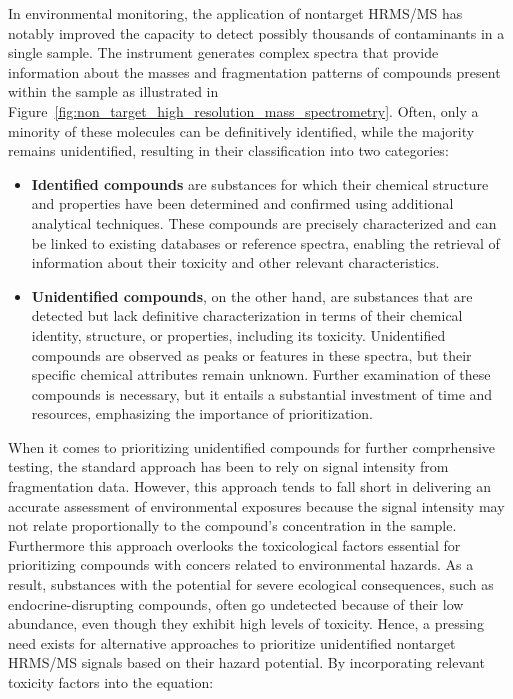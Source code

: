 In environmental monitoring, the application of nontarget HRMS/MS has notably improved the capacity to detect possibly thousands of contaminants in a single sample. The instrument generates complex spectra that provide information about the masses and fragmentation patterns of compounds present within the sample as illustrated in Figure~\ref{fig:non_target_high_resolution_mass_spectrometry}. Often, only a minority of these molecules can be definitively identified, while the majority remains unidentified, resulting in their classification into two categories:
\begin{itemize}
    \item \textbf{Identified compounds} are substances for which their chemical structure and properties have been determined and confirmed using additional analytical techniques. These compounds are precisely characterized and can be linked to existing databases or reference spectra, enabling the retrieval of information about their toxicity and other relevant characteristics.
    \item \textbf{Unidentified compounds}, on the other hand, are substances that are detected but lack definitive characterization in terms of their chemical identity, structure, or properties, including its toxicity. Unidentified compounds are observed as peaks or features in these spectra, but their specific chemical attributes remain unknown. 
    Further examination of these compounds is necessary, but it entails a substantial investment of time and resources, emphasizing the importance of prioritization.
    
\end{itemize}

When it comes to prioritizing unidentified compounds for further comprhensive testing, the standard approach has been to rely on signal intensity from fragmentation data. However, this approach tends to fall short in delivering an accurate assessment of environmental exposures because the signal intensity may not relate proportionally to the compound's concentration in the sample. Furthermore this approach overlooks the toxicological factors essential for prioritizing compounds with concers related to environmental hazards. As a result, substances with the potential for severe ecological consequences, such as endocrine-disrupting compounds, often go undetected because of their low abundance, even though they exhibit high levels of toxicity. Hence, a pressing need exists for alternative approaches to prioritize unidentified nontarget HRMS/MS signals based on their hazard potential. By incorporating relevant toxicity factors into the equation:

